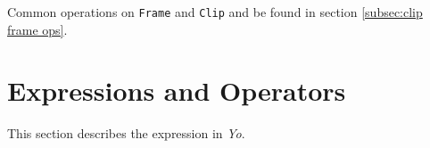 \documentclass[12pt]{article}
\begin{document}
Common operations on \texttt{Frame} and \texttt{Clip} and be found in section \ref{subsec:clip frame ops}.






\section{Expressions and Operators} %
This section describes the expression in \textit{Yo}. 
\end{document}
